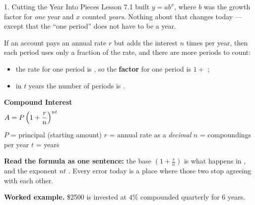 \documentclass[10pt]{article}
\newcommand{\TallMath}[1]{$\displaystyle #1\rule[-1.4em]{0pt}{3.2em}$}
\begin{document}
\boxguard
\begin{notesbox}{1. Cutting the Year Into Pieces}
Lesson 7.1 built $y=ab^{x}$, where $b$ was the growth factor for \emph{one} year and $x$ counted
\emph{years}. Nothing about that changes today --- except that the ``one period'' does not have to be a
year.

\vspace{4pt}
If an account pays an annual rate $r$ but adds the interest $n$ times per year, then each period uses
only a fraction of the rate, and there are more periods to count:

\vspace{2pt}
\begin{itemize}[leftmargin=1.4em, itemsep=2pt]
  \item the rate for one period is \blank{1.6cm}, so the \textbf{factor} for one period is $1+$ \blank{1.6cm};
  \item in $t$ years the number of periods is \blank{1.6cm}.
\end{itemize}

\vspace{4pt}
\begin{center}
\begin{tcolorbox}[colback=goldbg, colframe=goldacc, boxrule=0.8pt, arc=1.5mm, width=0.92\linewidth,
    left=3mm, right=3mm, top=2mm, bottom=2mm]
\centering
\textbf{Compound Interest} \\[3pt]
\TallMath{A = P\left(1+\frac{r}{n}\right)^{nt}}
\\[1pt]
{\small $P$ = principal (starting amount) \quad $r$ = annual rate as a \emph{decimal} \quad
$n$ = compoundings per year \quad $t$ = years}
\end{tcolorbox}
\end{center}

\vspace{2pt}
\textbf{Read the formula as one sentence:} the base $\left(1+\frac{r}{n}\right)$ is what happens in
\blank{3.6cm}, and the exponent $nt$ \blank{3.6cm}. Every error today is a place where those two stop
agreeing with each other.

\vspace{5pt}
\textbf{Worked example.} \$2500 is invested at $4\%$ compounded quarterly for $6$ years.


\end{notesbox}
\end{document}
